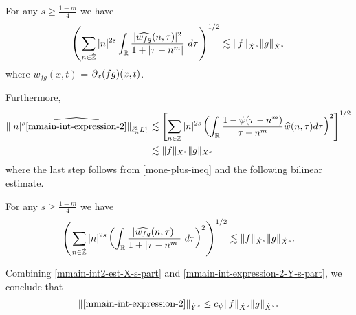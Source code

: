 %
%
%
%
%
%
\begin{proposition}
	\label{mprop:prim-bilin-est}
	For any $s \ge \frac{1-m}{4}$ we have
	\begin{equation}
		\label{mprim-bilin-est}
		\left( \sum_{n \in \dot{\mathbb{Z}}} |n|^{2s} \int_{\mathbb{R}}
		\frac{|\widehat{w_{fg}}(n, \tau) |^2}{1+ |\tau - 
		n^m| } 
		 \ d \tau 
		\right)^{1/2}
		\lesssim \|f\|_{\dot{X}^s} \|g\|_{\dot{X}^s}
	\end{equation}
	where $w_{fg}(x,t)$ = $\partial_x(fg)(x,t)$.
\end{proposition}
Furthermore,
%
%
%
%
\begin{equation}
	\label{mmain-int-expression-2-Y-s-part}
	\begin{split}
		\| | n |^{s} \widehat{\eqref{mmain-int-expression-2}} \|_{\dot{\ell}^2_n L^1_\tau}
		& \lesssim 
		\left[ \sum_{n \in \mathbb{Z}}|n|^{2s} \left(
		\int_{\mathbb{R}}\frac{1 - \psi(\tau - n^m)}{\tau - n^m} \widehat{w}(n, \tau) d
		\tau \right)^{2} \right]^{1/2}
		\\
		& \lesssim \|f\|_{X^s} \|g\|_{X^s}
	\end{split}
\end{equation}
%
%
where the last step follows from \eqref{mone-plus-ineq} and
the following bilinear estimate.
%
%
%
%
%
%
%
\begin{proposition}
\label{mprop:bilinear-estimate2}
For any $s \ge \frac{1-m}{4}$ we have
%
%
\begin{equation}
	\label{mbilinear-estimate2}
	\begin{split}
		\left( \sum_{n \in \dot{\mathbb{Z}}} |n|^{2s}  \left ( \int_{\mathbb{R}} 
		\frac{|\widehat{w_{fg}}(n, \tau) |}{1 + | \tau - n^m |}
		 \ d\tau \right)^2  \right)^{1/2} \lesssim \|f\|_{\dot{X}^s} \|g\|_{\dot{X}^s}.
	\end{split}
\end{equation}
\end{proposition}
%
%
Combining \eqref{mmain-int2-est-X-s-part} and
\eqref{mmain-int-expression-2-Y-s-part}, we conclude that
%
%
%
%
\begin{equation}
	\label{mmain-int2-est}
	\begin{split}
		\|\eqref{mmain-int-expression-2}\|_{\dot{Y}^s} \le c_{\psi}\|f\|_{\dot{X}^s} \|g\|_{\dot{X}^s}.
	\end{split}
\end{equation}
%
%
